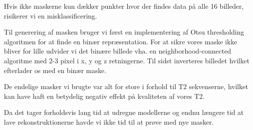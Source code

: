 Hvis ikke maskerne kun dækker punkter hvor der findes data på alle 16 billeder, risikerer vi en misklassificering. 

Til generering af masken bruger vi først en implementering af Otsu
thresholding algoritmen for at finde en binær repræsentation. For at
sikre vores maske ikke bliver for lille udvider vi det binære billede
vha. en neighborhood-connected algoritme med 2-3 pixel i x, y og z
retningerne. Til sidst inverteres billedet hvilket efterlader os med en
binær maske.

De endelige masker vi brugte var alt for store i forhold til T2 sekvenserne, hvilket kan have haft en betydelig negativ effekt på kvaliteten af vores T2.

Da det tager forholdsvis lang tid at udregne modellerne og endnu længere tid at lave rekonstruktionerne havde vi ikke tid til at prøve med nye masker.

